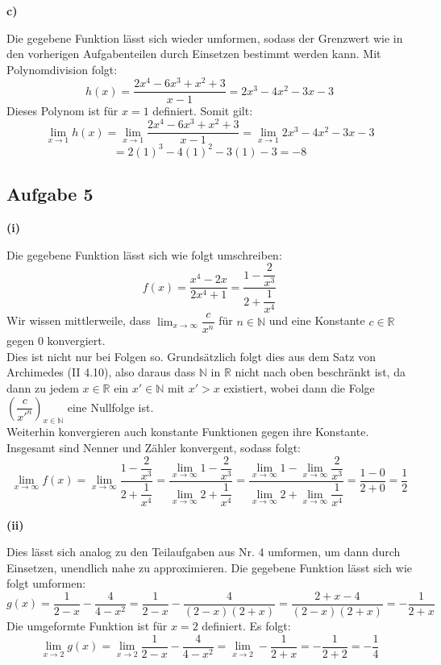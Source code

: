 \documentclass[a4paper,graphics,11pt]{article}
\newcommand{\aufgabe}[1]{\subsection*{Aufgabe #1}}
\begin{document}
\textbf{c)}

Die gegebene Funktion lässt sich wieder umformen, sodass der Grenzwert wie in den vorherigen
Aufgabenteilen durch Einsetzen bestimmt werden kann. Mit Polynomdivision folgt:
$$
    h(x) = \frac{2x^4-6x^3+x^2+3}{x-1} = 2x^3-4x^2-3x-3
$$
Dieses Polynom ist für $x=1$ definiert. Somit gilt:
$$
    \lim_{x \to 1} h(x)
    = \lim_{x \to 1} \frac{2x^4-6x^3+x^2+3}{x-1}
    = \lim_{x \to 1} 2x^3-4x^2-3x-3
$$$$
    = 2(1)^3-4(1)^2-3(1)-3 = -8
$$

\newpage

\aufgabe{5}
\textbf{(i)}

Die gegebene Funktion lässt sich wie folgt umschreiben:
$$
    f(x) = \frac{x^4-2x}{2x^4+1} = \frac{1-\dfrac{2}{x^3}}{2+\dfrac{1}{x^4}}
$$
Wir wissen mittlerweile, dass $\lim_{x \to \infty}\limits \dfrac{c}{x^n}$ für
$n \in \mathbb{N}$ und eine Konstante $c \in \mathbb{R}$ gegen 0 konvergiert.\\[2pt]
Dies ist nicht nur bei Folgen so.
Grundsätzlich folgt dies aus dem Satz von Archimedes (II 4.10), also
daraus dass $\mathbb{N}$ in $\mathbb{R}$ nicht nach oben beschränkt ist, da dann
zu jedem $x \in \mathbb{R}$ ein $x' \in \mathbb{N}$ mit $x'>x$ existiert, wobei
dann die Folge $\left(\dfrac{c}{x'^n}\right)_{x \in \mathbb{N}}$ eine Nullfolge ist.\\[2pt]
Weiterhin konvergieren auch konstante Funktionen gegen ihre Konstante.
Insgesamt sind Nenner und Zähler konvergent, sodass folgt:
$$
    \lim_{x \to \infty} f(x)
    = \lim_{x \to \infty} \frac{1-\dfrac{2}{x^3}}{2+\dfrac{1}{x^4}}
    = \frac{\lim_{x \to \infty}\limits 1 - \dfrac{2}{x^3}}{\lim_{x \to \infty}\limits 2+\dfrac{1}{x^4}} 
    = \frac{\lim_{x \to \infty}\limits 1 - \lim_{x \to \infty}\limits \dfrac{2}{x^3}}
        {\lim_{x \to \infty}\limits 2 + \lim_{x \to \infty}\limits \dfrac{1}{x^4}}
    = \frac{1-0}{2+0} = \frac{1}{2}
$$

\textbf{(ii)}

Dies lässt sich analog zu den Teilaufgaben aus Nr. 4 umformen, um dann durch Einsetzen,
unendlich nahe zu approximieren. Die gegebene Funktion lässt sich wie folgt umformen:
$$
    g(x) = \frac{1}{2-x} - \frac{4}{4-x^2}
    = \frac{1}{2-x} - \frac{4}{(2-x)(2+x)}
    = \frac{2+x-4}{(2-x)(2+x)}
    = -\frac{1}{2+x}
$$
Die umgeformte Funktion ist für $x=2$ definiert. Es folgt:
$$
    \lim_{x \to 2} g(x)
    = \lim_{x \to 2} \frac{1}{2-x} - \frac{4}{4-x^2}
    = \lim_{x \to 2} - \frac{1}{2+x}
    = - \frac{1}{2+2}
    = -\frac{1}{4}
$$
\end{document}
